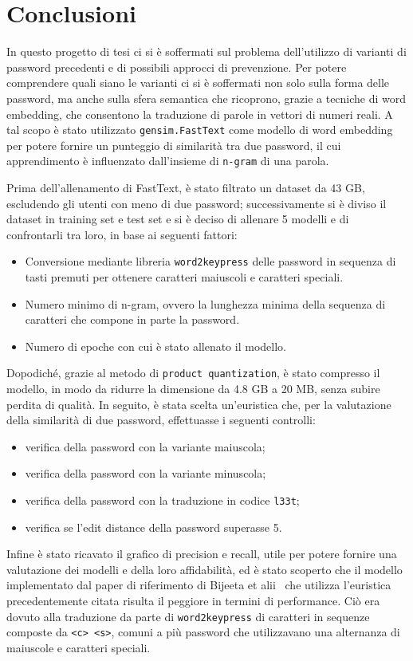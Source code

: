 \chapter*{Conclusioni}
In questo progetto di tesi ci si è soffermati sul problema dell'utilizzo di varianti di password precedenti e di possibili approcci di prevenzione. Per potere comprendere quali siano le varianti ci si è soffermati non solo sulla forma delle password, ma anche sulla sfera semantica che ricoprono, grazie a tecniche di word embedding, che consentono la traduzione di parole in vettori di numeri reali. A tal scopo è stato utilizzato \texttt{gensim.FastText} come modello di word embedding per potere fornire un punteggio di similarità tra due password, il cui apprendimento è influenzato dall'insieme di \texttt{n-gram} di una parola.

Prima dell'allenamento di FastText, è stato filtrato un dataset da 43 GB, escludendo gli utenti con meno di due password; successivamente si è diviso il dataset in training set e test set e si è deciso di allenare 5 modelli e di confrontarli tra loro, in base ai seguenti fattori:
\begin{itemize}
    \item Conversione mediante libreria \texttt{word2keypress} delle password in sequenza di tasti premuti per ottenere caratteri maiuscoli e caratteri speciali.
    \item Numero minimo di n-gram, ovvero la lunghezza minima della sequenza di caratteri che compone in parte la password.
    \item Numero di epoche con cui è stato allenato il modello.
\end{itemize}
Dopodiché, grazie al metodo di \texttt{product quantization}, è stato compresso il modello, in modo da ridurre la dimensione da 4.8 GB a 20 MB, senza subire perdita di qualità. In seguito, è stata scelta un'euristica che, per la valutazione della similarità di due password, effettuasse i seguenti controlli:
\begin{itemize}
    \item verifica della password con la variante maiuscola;
    \item verifica della password con la variante minuscola;
    \item verifica della password con la traduzione in codice \texttt{l33t};
    \item verifica se l'edit distance della password superasse 5.
\end{itemize}
Infine è stato ricavato il grafico di precision e recall, utile per potere fornire una valutazione dei modelli e della loro affidabilità, ed è stato scoperto che il modello implementato dal paper di riferimento di Bijeeta et alii~\cite{biijeta} che utilizza l'euristica precedentemente citata risulta il peggiore in termini di performance. Ciò era dovuto alla traduzione da parte di \texttt{word2keypress} di caratteri in sequenze composte da \texttt{<c> <s>}, comuni a più password che utilizzavano una alternanza di maiuscole e caratteri speciali.

